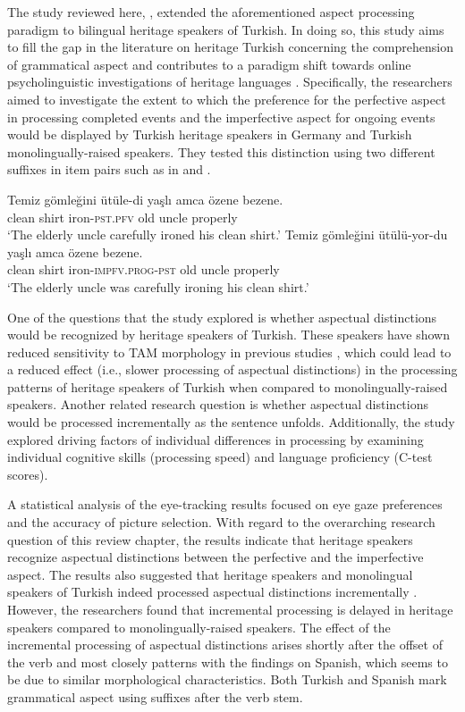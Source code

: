 \documentclass[output=paper,colorlinks,citecolor=brown]{langscibook}
\begin{document}
The study reviewed here, \textcite{Ozsoy_2023}, extended the aforementioned aspect processing paradigm to bilingual heritage speakers of Turkish. In doing so, this study aims to fill the gap in the literature on heritage Turkish concerning the comprehension of grammatical aspect and contributes to a paradigm shift towards online psycholinguistic investigations of heritage languages \parencite{Bayram_2021}. Specifically, the researchers aimed to investigate the extent to which the preference for the perfective aspect in processing completed events and the imperfective aspect for ongoing events would be displayed by Turkish heritage speakers in Germany and Turkish monolingually-raised speakers. They tested this distinction using two different suffixes in item pairs such as in  and .

\ea \label{TurkishPerfectiveVWP}
\gll Temiz gömleğini ütüle-di yaşlı amca {özene bezene}.\\
clean shirt iron-\textsc{pst.pfv} old uncle properly\\
\glt ‘The elderly uncle carefully ironed his clean shirt.’
\ex \label{TurkishImperfectiveVWP}
\gll Temiz gömleğini ütülü-yor-du yaşlı amca {özene bezene}.\\
clean shirt iron-\textsc{impfv.prog-pst} old uncle properly\\
\glt ‘The elderly uncle was carefully ironing his clean shirt.’
\z
{}

One of the questions that the study explored is whether aspectual distinctions would be recognized by heritage speakers of Turkish. These speakers have shown reduced sensitivity to TAM morphology in previous studies \parencite{arslan2017processing, aylin2018second}, which could lead to a reduced effect (i.e., slower processing of aspectual distinctions) in the processing patterns of heritage speakers of Turkish when compared to monolingually-raised speakers. Another related research question is whether aspectual distinctions would be processed incrementally as the sentence unfolds. Additionally, the study explored driving factors of individual differences in processing by examining individual cognitive skills (processing speed) and language proficiency (C-test scores). 

A statistical analysis of the eye-tracking results focused on eye gaze preferences and the accuracy of picture selection. With regard to the overarching research question of this review chapter, the results indicate that heritage speakers recognize aspectual distinctions between the perfective and the imperfective aspect. The results also suggested that heritage speakers and monolingual speakers of Turkish indeed processed aspectual distinctions incrementally \parencite[see also][]{Ozsoy_2024}. However, the researchers found that incremental processing is delayed in heritage speakers compared to monolingually-raised speakers. The effect of the incremental processing of aspectual distinctions arises shortly after the offset of the verb and most closely patterns with the findings on Spanish, which seems to be due to similar morphological characteristics. Both Turkish and Spanish mark grammatical aspect using suffixes after the verb stem.
\end{document}
